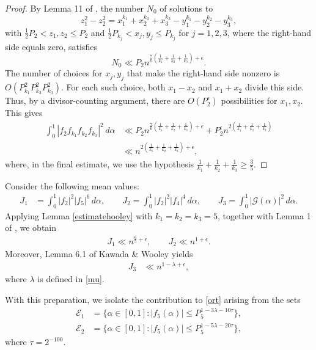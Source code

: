 \documentclass{article}
\theoremstyle{plain}
\begin{document}
\begin{proof}
    By Lemma 11 of \cite{Hooley1981}, the number $N_0$ of solutions to 
    $$z_1^2-z_2^2=x_1^{k_1}+x_2^{k_2}+x_3^{k_3}- y_1^{k_1}-y_2^{k_2}-y_3^{k_3},$$
    with $ \tfrac{1}{2}P_{2}<z_1,z_2\leq P_{2}$ and $\tfrac{1}{2}P_{k_j}<x_j,y_j\leq P_{k_j} $ for $j=1,2,3$, where the right-hand side equals zero, satisfies 
    $$N_0\ll P_2n^{\frac{7}{6}\left( \frac{1}{k_1}+\frac{1}{k_2}+\frac{1}{k_3}\right)+\epsilon}.$$ 
    The number of choices for $x_j,y_j$ that make the right-hand side nonzero is $O(P_{k_1}^2P_{k_2}^2P_{k_3}^2)$. For each such choice, both $x_1-x_2$ and $x_1+x_2$ divide this side. Thus, by a divisor-counting argument, there are $O(P_2^\epsilon)$ possibilities for $x_1,x_2$. This gives 
    \begin{align*}
        \int_{0}^{1}|f_2f_{k_1}f_{k_2}f_{k_3}|^2 \, d\alpha &\ll P_2n^{\frac{7}{6}\left( \frac{1}{k_1}+\frac{1}{k_2}+\frac{1}{k_3}\right)+\epsilon} + P_2^{\epsilon}n^{2\left( \frac{1}{k_1}+\frac{1}{k_2}+\frac{1}{k_3}\right)} \\
        &\ll n^{2\left( \frac{1}{k_1}+\frac{1}{k_2}+\frac{1}{k_3}\right)+\epsilon},
    \end{align*}
    where, in the final estimate, we use the hypothesis $\tfrac{1}{k_1}+\tfrac{1}{k_2}+\tfrac{1}{k_3}\geq \tfrac{3}{5}$. 
\end{proof}



Consider the following mean values:
\begin{align*}
    J_1 &= \int_{0}^{1} |f_{2}|^2|f_{5}|^6 \, d\alpha, \qquad
    J_2 = \int_{0}^{1} |f_{2}|^2|f_4|^4 \, d\alpha,\qquad
    J_3=\int_{0}^{1} |\mathcal{G}(\alpha)|^2 \, d\alpha.
\end{align*}
Applying Lemma \ref{estimatehooley} with $k_1=k_2=k_3=5$, together with Lemma 1 of \cite{Bru87}, we obtain
\begin{align}\label{j1j2}
    J_1 \ll n^{\frac{6}{5}+\epsilon}, \qquad J_2 \ll n^{1+\epsilon}.
\end{align}
Moreover, Lemma 6.1 of Kawada \& Wooley \cite{KawadaWooley2001} yields 
\begin{align}\label{j3j4}
    J_3 &\ll n^{1-\lambda+\epsilon},
\end{align}
where $\lambda$ is defined in \eqref{mu}.

With this preparation, we isolate the contribution to \eqref{ort} arising from the sets
\begin{align*}
    \mathcal{E}_1 &= \{ \alpha \in [0,1] : |f_{5}(\alpha)| \leq P_5^{1-3\lambda-10\tau} \},\\
     \mathcal{E}_2 &= \{ \alpha \in [0,1] : |f_{5}(\alpha)| \leq P_5^{1-5\lambda-20\tau} \},
\end{align*}
where $\tau = 2^{-100}$.
\end{document}
